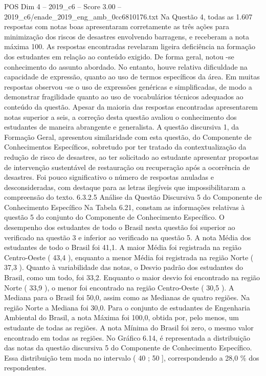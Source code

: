 \begin{textsample}{POS Dim 4 – 2019\_c6 – Score 3.00 – 2019\_c6/enade\_2019\_eng\_amb\_0cc6810176.txt}
Na Questão 4, todas as 1.607 respostas com notas boas apresentaram corretamente as três ações para minimização dos riscos de desastres envolvendo barragens, e receberam a nota máxima 100.
As respostas encontradas revelaram ligeira deficiência na formação dos estudantes em relação ao conteúdo exigido.
De forma geral, notou -se conhecimento do assunto abordado.
No entanto, houve relativa dificuldade na capacidade de expressão, quanto ao uso de termos específicos da área.
Em muitas respostas observou -se o uso de expressões genéricas e simplificadas, de modo a demonstrar fragilidade quanto ao uso de vocabulários técnicos adequados ao conteúdo da questão.
Apesar da maioria das respostas encontradas apresentarem notas superior a seis, a correção desta questão avaliou o conhecimento dos estudantes de maneira abrangente e generalista.
A questão discursiva 1, da Formação Geral, apresentou similaridade com esta questão, do Componente de Conhecimentos Específicos, sobretudo por ter tratado da contextualização da redução de risco de desastres, ao ter solicitado ao estudante apresentar propostas de intervenção sustentável de restauração ou recuperação após a ocorrência de desastres.
Foi pouco significativo o número de respostas anuladas e desconsideradas, com destaque para as letras ilegíveis que impossibilitaram a compreensão do texto. 6.3.2.5 Análise da Questão Discursiva 5 do Componente de Conhecimento Específico Na Tabela 6.21, constam as informações relativas à questão 5 do conjunto do Componente de Conhecimento Específico.
O desempenho dos estudantes de todo o Brasil nesta questão foi superior ao verificado na questão 3 e inferior ao verificado na questão 5.
A nota Média dos estudantes de todo o Brasil foi 41,1.
A maior Média foi registrada na região Centro-Oeste ( 43,4 ), enquanto a menor Média foi registrada na região Norte ( 37,3 ).
Quanto à variabilidade das notas, o Desvio padrão dos estudantes do Brasil, como um todo, foi 33,2.
Enquanto o maior desvio foi encontrado na região Norte ( 33,9 ), o menor foi encontrado na região Centro-Oeste ( 30,5 ).
A Mediana para o Brasil foi 50,0, assim como as Medianas de quatro regiões.
Na região Norte a Mediana foi 30,0.
Para o conjunto de estudantes de Engenharia Ambiental do Brasil, a nota Máxima foi 100,0, obtida por, pelo menos, um estudante de todas as regiões.
A nota Mínima do Brasil foi zero, o mesmo valor encontrado em todas as regiões.
No Gráfico 6.14, é representada a distribuição das notas da questão discursiva 5 do Componente de Conhecimento Específico.
Essa distribuição tem moda no intervalo ( 40 ; 50 ], correspondendo a 28,0 \% dos respondentes.

\end{textsample}

